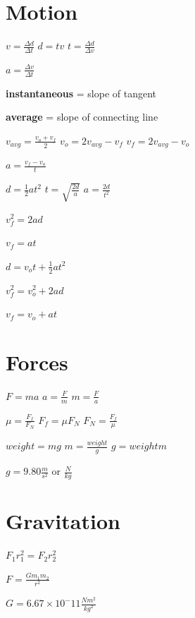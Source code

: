 \documentclass[11pt]{article}
\begin{document}
\section{Motion}
\begin{multicols}{2}

$v=\frac{\Delta d}{\Delta t}$ \overrightarrow{} $d=tv$ \overrightarrow{} $t=\frac{\Delta d}{\Delta v}$

$a=\frac{\Delta v}{\Delta t}$

\textbf{instantaneous} = slope of tangent

\textbf{average} = slope of connecting line

$v_{avg}=\frac{v_{o}+v_{f}}{2}$ \overrightarrow{} $v_{o}=2v_{avg}-v_{f}$ \overrightarrow{} $v_{f}=2v_{avg}-v_{o}$

$a=\frac{v_{f}-v_{o}}{t}$

$d=\frac{1}{2}at^2$ \overrightarrow{} $t=\sqrt{\frac{2d}{a}}$ \overrightarrow{} $a=\frac{2d}{t^2}$

$v_{f}^2=2ad$

$v_{f}=at$

$d=v_{o}t+\frac{1}{2}at^2$

$v_{f}^2=v_{o}^2+2ad$

$v_{f}=v_{o}+at$
\end{multicols}

\section{Forces}
\begin{multicols}{2}

$F=ma$ \overrightarrow{} $a=\frac{F}{m}$ \overrightarrow{} $m=\frac{F}{a}$

$\mu = \frac{F_{f}}{F_{N}}$ \overrightarrow{} $F_{f}=\mu F_{N}$ \overrightarrow{} $F_{N}=\frac{F_{f}}{\mu}$

$weight=mg$ \overrightarrow{} $m=\frac{weight}{g}$ \overrightarrow{} $g={weight}{m}$

$g=9.80\frac{m}{s^2}$ or $\frac{N}{kg}$
\end{multicols}

\section{Gravitation}
\begin{multicols}{2}

$F_{1}r_{1}^2=F_{2}r_{2}^2$

$F=\frac{Gm_{1}m_{2}}{r^2}$

$G=6.67\times 10^-11 \frac{Nm^2}{kg^2}$
\end{multicols}
\end{document}
